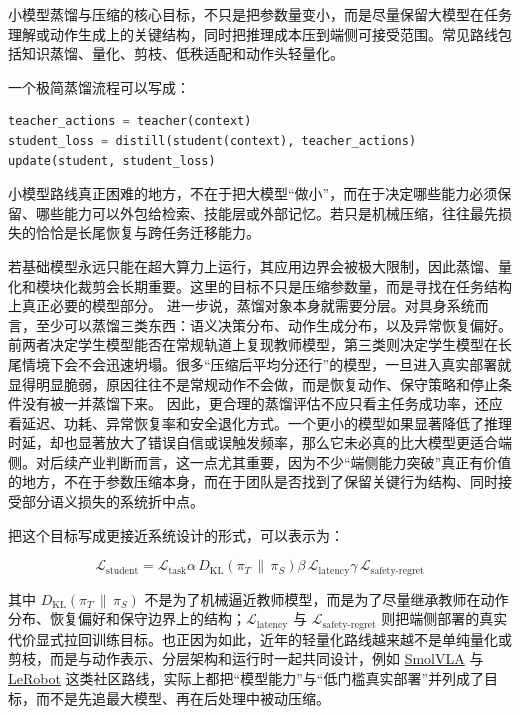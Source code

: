 小模型蒸馏与压缩的核心目标，不只是把参数量变小，而是尽量保留大模型在任务理解或动作生成上的关键结构，同时把推理成本压到端侧可接受范围。常见路线包括知识蒸馏、量化、剪枝、低秩适配和动作头轻量化。

一个极简蒸馏流程可以写成：

\begin{lstlisting}[language=python]
teacher_actions = teacher(context)
student_loss = distill(student(context), teacher_actions)
update(student, student_loss)
\end{lstlisting}

小模型路线真正困难的地方，不在于把大模型“做小”，而在于决定哪些能力必须保留、哪些能力可以外包给检索、技能层或外部记忆。若只是机械压缩，往往最先损失的恰恰是长尾恢复与跨任务迁移能力。

若基础模型永远只能在超大算力上运行，其应用边界会被极大限制，因此蒸馏、量化和模块化裁剪会长期重要。这里的目标不只是压缩参数量，而是寻找在任务结构上真正必要的模型部分。 进一步说，蒸馏对象本身就需要分层。对具身系统而言，至少可以蒸馏三类东西：语义决策分布、动作生成分布，以及异常恢复偏好。前两者决定学生模型能否在常规轨道上复现教师模型，第三类则决定学生模型在长尾情境下会不会迅速坍塌。很多“压缩后平均分还行”的模型，一旦进入真实部署就显得明显脆弱，原因往往不是常规动作不会做，而是恢复动作、保守策略和停止条件没有被一并蒸馏下来。 因此，更合理的蒸馏评估不应只看主任务成功率，还应看延迟、功耗、异常恢复率和安全退化方式。一个更小的模型如果显著降低了推理时延，却也显著放大了错误自信或误触发频率，那么它未必真的比大模型更适合端侧。对后续产业判断而言，这一点尤其重要，因为不少“端侧能力突破”真正有价值的地方，不在于参数压缩本身，而在于团队是否找到了保留关键行为结构、同时接受部分语义损失的系统折中点。

把这个目标写成更接近系统设计的形式，可以表示为：

\begingroup
\scriptsize
\begin{equation*}
\mathcal{L}_{\text{student}}
= \mathcal{L}_{\text{task}}
 \alpha\, D_{\mathrm{KL}}(\pi_T \,\|\, \pi_S)
 \beta\, \mathcal{L}_{\text{latency}}
 \gamma\, \mathcal{L}_{\text{safety-regret}}
\end{equation*}
\endgroup

其中 \(D_{\mathrm{KL}}(\pi_T \,\|\, \pi_S)\) 不是为了机械逼近教师模型，而是为了尽量继承教师在动作分布、恢复偏好和保守边界上的结构；\(\mathcal{L}_{\text{latency}}\) 与 \(\mathcal{L}_{\text{safety-regret}}\) 则把端侧部署的真实代价显式拉回训练目标。也正因为如此，近年的轻量化路线越来越不是单纯量化或剪枝，而是与动作表示、分层架构和运行时一起共同设计，例如 \href{https://arxiv.org/abs/2506.01844}{SmolVLA} 与 \href{https://github.com/huggingface/lerobot}{LeRobot} 这类社区路线，实际上都把“模型能力”与“低门槛真实部署”并列成了目标，而不是先追最大模型、再在后处理中被动压缩。

